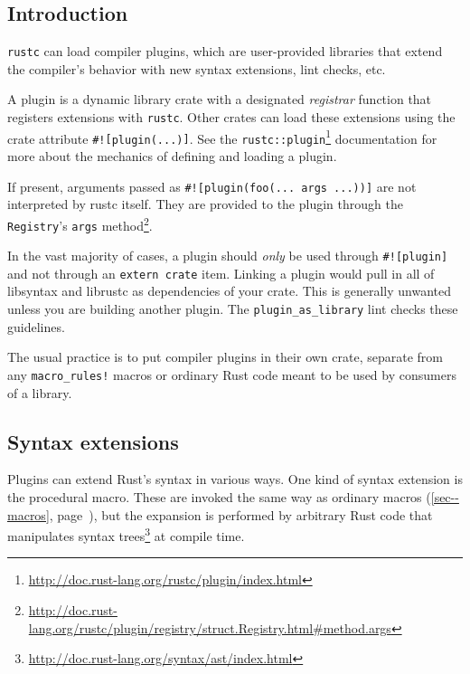 \documentclass[a4paper,]{book}
\renewcommand*{\hyperref}[2][\ar]{%
  \def\ar{#2}%
  #2 (\autoref{#1}, page~\pageref{#1})}
\renewcommand{\href}[2]{#2\footnote{\url{#1}}}
\begin{document}

\subsection{Introduction}\label{introduction-2}

\texttt{rustc} can load compiler plugins, which are user-provided
libraries that extend the compiler's behavior with new syntax
extensions, lint checks, etc.

A plugin is a dynamic library crate with a designated \emph{registrar}
function that registers extensions with \texttt{rustc}. Other crates can
load these extensions using the crate attribute
\texttt{\#!{[}plugin(...){]}}. See the
\href{http://doc.rust-lang.org/rustc/plugin/index.html}{\texttt{rustc::plugin}}
documentation for more about the mechanics of defining and loading a
plugin.

If present, arguments passed as
\texttt{\#!{[}plugin(foo(...\ args\ ...)){]}} are not interpreted by
rustc itself. They are provided to the plugin through the
\texttt{Registry}'s
\href{http://doc.rust-lang.org/rustc/plugin/registry/struct.Registry.html\#method.args}{\texttt{args}
method}.

In the vast majority of cases, a plugin should \emph{only} be used
through \texttt{\#!{[}plugin{]}} and not through an
\texttt{extern\ crate} item. Linking a plugin would pull in all of
libsyntax and librustc as dependencies of your crate. This is generally
unwanted unless you are building another plugin. The
\texttt{plugin\_as\_library} lint checks these guidelines.

The usual practice is to put compiler plugins in their own crate,
separate from any \texttt{macro\_rules!} macros or ordinary Rust code
meant to be used by consumers of a library.

\subsection{Syntax extensions}\label{syntax-extensions}

Plugins can extend Rust's syntax in various ways. One kind of syntax
extension is the procedural macro. These are invoked the same way as
\hyperref[sec--macros]{ordinary macros}, but the expansion is performed
by arbitrary Rust code that manipulates
\href{http://doc.rust-lang.org/syntax/ast/index.html}{syntax trees} at
compile time.
\end{document}
